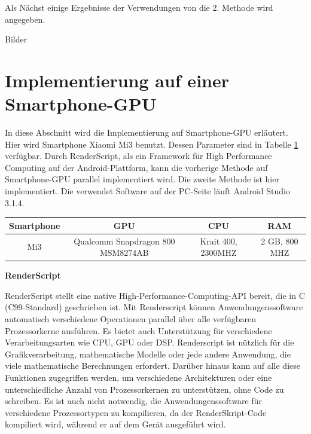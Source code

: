 Als Nächst einige Ergebnisse der Verwendungen von die 2. Methode wird angegeben.

Bilder

\section{Implementierung auf einer Smartphone-GPU}

In diese Abschnitt wird die Implementierung auf Smartphone-GPU erläutert. Hier wird Smartphone Xiaomi Mi3 benutzt. Dessen Parameter sind in Tabelle \ref{tbl:Grundlegende Parameter für Mi3} verfügbar. 
Durch RenderScript, als ein Framework für High Performance Computing auf der Android-Plattform, kann die vorherige Methode auf Smartphone-GPU parallel implementiert wird. Die zweite Methode ist hier implementiert. Die verwendet Software auf der PC-Seite läuft Android Studio 3.1.4.

\begin{table}[htb]
	\label{tbl:Grundlegende Parameter für Mi3}
	\footnotesize
	\centering
	\begin{tabular}{|c|c|c|c|}
	\toprule
	\textbf{Smartphone} & \textbf{GPU} & \textbf{CPU} & \textbf{RAM}\\
	\midrule
	Mi3  & Qualcomm Snapdragon 800 MSM8274AB & Krait 400, 2300MHZ & 2 GB, 800 MHZ \\
	\bottomrule
	\end{tabular}
\end{table} 

\textbf{RenderScript}

RenderScript stellt eine native High-Performance-Computing-API bereit, die in C (C99-Standard) geschrieben ist. Mit Renderscript können Anwendungenssoftware automatisch verschiedene Operationen parallel über alle verfügbaren Prozessorkerne ausführen. Es bietet auch Unterstützung für verschiedene Verarbeitungsarten wie CPU, GPU oder DSP. Renderscript ist nützlich für die Grafikverarbeitung, mathematische Modelle oder jede andere Anwendung, die viele mathematische Berechnungen erfordert. Darüber hinaus kann auf alle diese Funktionen zugegriffen werden, um verschiedene Architekturen oder eine unterschiedliche Anzahl von Prozessorkernen zu unterstützen, ohne Code zu schreiben. Es ist auch nicht notwendig, die Anwendungenssoftware für verschiedene Prozessortypen zu kompilieren, da der RenderSkript-Code kompiliert wird, während er auf dem Gerät ausgeführt wird.

